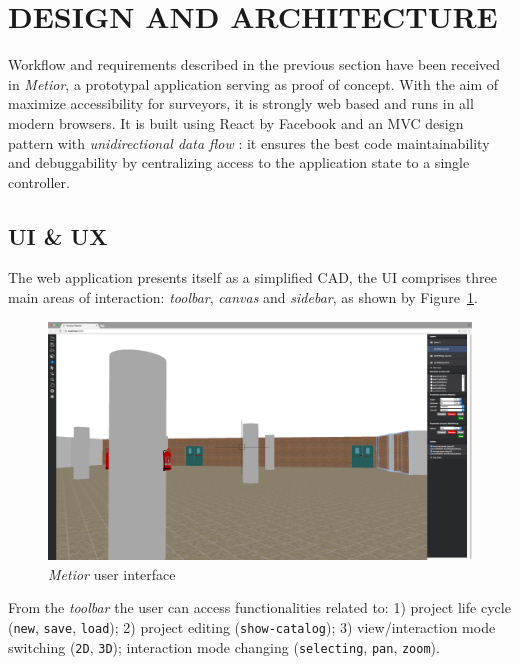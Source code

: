 \section{\uppercase{Design and Architecture}}
\label{sec:architecture}

\noindent Workflow and requirements described in the previous section have been received in \emph{Metior}, a prototypal application serving as proof of concept. With the aim of maximize accessibility for surveyors, it is strongly web based and runs in all modern browsers. It is built using React by Facebook and an MVC design pattern with \emph{unidirectional data flow} \cite{redux}:  it ensures the best code maintainability and debuggability by centralizing access to the application state to a single controller.

\subsection{UI \& UX}

The web application presents itself as a simplified CAD,  the UI comprises three main areas of interaction: \emph{toolbar}, \emph{canvas} and \emph{sidebar}, as shown by Figure~\ref{fig:ui}.

\begin{figure}[htbp] %
   \centering

   \includegraphics[width=1\linewidth]{images/ui}

   \caption{\emph{Metior} user interface}
   \label{fig:ui}
\end{figure}

\noindent From the \emph{toolbar} the user can access functionalities related to: 1) project life cycle ({\tt new}, {\tt save}, {\tt load}); 2) project editing  ({\tt  show-catalog}); 3) view/interaction mode switching ({\tt 2D}, {\tt  3D}); interaction mode changing ({\tt  selecting}, {\tt pan}, {\tt zoom}).


